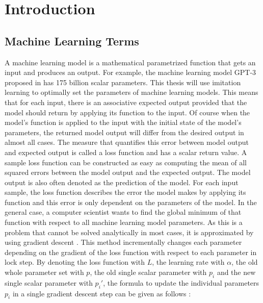 \documentclass[draft,final]{vutinfth} %
\begin{document}

    \tableofcontents %

    \mainmatter

    \chapter{Introduction}

    \section{Machine Learning Terms}
    A machine learning model is a mathematical parametrized function that gets an input and produces an output.
    For example, the machine learning model GPT-3 proposed in \cite{GPT-3} has 175 billion scalar parameters.
    This thesis will use imitation learning to optimally set the parameters of machine learning models.
    This means that for each input, there is an associative expected output provided that the model should return by applying its function to the input.
    Of course when the model's function is applied to the input with the initial state of the model's parameters, the returned model output will differ from the desired output in almost all cases.
    The measure that quantifies this error between model output and expected output is called a loss function and has a scalar return value.
    A sample loss function can be constructed as easy as computing the mean of all squared errors between the model output and the expected output.
    The model output is also often denoted as the prediction of the model.
    For each input sample, the loss function describes the error the model makes by applying its function and this error is only dependent on the parameters of the model.
    In the general case, a computer scientist wants to find the global minimum of that function with respect to all machine learning model parameters.
    As this is a problem that cannot be solved analytically in most cases, it is approximated by using gradient descent \cite{GradientDescent}.
    This method incrementally changes each parameter depending on the gradient of the loss function with respect to each parameter in lock step.
    By denoting the loss function with $L$, the learning rate with $\alpha$, the old whole parameter set with $p$, the old single scalar parameter with $p_i$ and the new single scalar parameter with $p_i'$, the formula to update the individual parameters $p_i$ in a single gradient descent step can be given as follows \cite{GradientDescent}:
\end{document}
